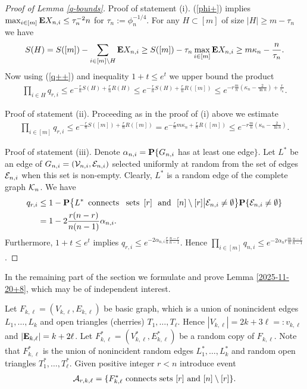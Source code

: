 \documentclass[11pt, a4paper]{article}
\newcommand{\E}{{\bf{E}}}
\newcommand{\PP}{{\bf{P}}}
\begin{document}
\begin{proof}[Proof of Lemma \ref{q-bounds}]
Proof of statement  (i). 
(\ref{phi+}) implies 
$\max_{i\in[m]}\E X_{n,i}\le \tau_n^{-2}n$ for
 $\tau_n:=\phi^{-1/4}_n$. 
For any $H\subset [m]$ of size $|H|\ge m-\tau_n$ we have 
\begin{align*}
S(H)
=
S([m])-\sum_{i\in [m]\setminus H}\E X_{n,i}
\ge 
S([m])-\tau_n \max_{i\in [m]}\E X_{n,i}
\ge 
m\kappa_n-\frac{n}{\tau_n}.
\end{align*}
Now 
using (\ref{q++}) and inequality $1+t\le e^t$ we 
upper bound the product
\begin{align*}
\prod_{i\in H}q_{r,i}
\le e^{-\frac{r}{n}S(H)+\frac{r}{n}R(H)}
\le e^{-\frac{r}{n}S(H)+\frac{r}{n}R([m])}
\le 
e^{-r\frac{m}{n}\left(\kappa_n-\frac{2}{\ln n}\right)+\frac{r}{\tau_n}}.
\end{align*}

Proof of statement (ii). Proceeding as in the proof of (i) above
we estimate
\begin{align*}
\prod_{i\in [m]}
q_{r,i}
\le e^{-\frac{r}{n}S([m])+\frac{r}{n}R([m])}
= e^{-\frac{r}{n}m\kappa_n+\frac{r}{n}R([m])}
\le 
e^{-r\frac{m}{n}\left(\kappa_n-\frac{2}{\ln n}\right)}.
\end{align*}

Proof of statement (iii). Denote 
$\alpha_{n,i}=\PP\{G_{n,i}$ has at least one edge$\}$.  
Let $L^*$ be an edge of 
$G_{n,i}=({\cal V}_{n,i},{\cal E}_{n,i})$ selected uniformly at 
random from the set of edges ${\cal E}_{n,i}$ when this set is non-empty. Clearly, $L^*$ 
is a random edge of the complete graph ${\cal K}_n$. 
We have
\begin{align*}
q_{r,i}
&
\le 
1
-
\PP\bigl\{
L^* {\text{\, connects \, sets\, }} [r] {\text{ \ and \ }} [n]\setminus[r]\bigr|{\cal E}_{n,i}\not=\emptyset
\bigr\}
\PP\{{\cal E}_{n,i}\not=\emptyset\}
\\
&
=
1-2\frac{r(n-r)}{n(n-1)}\alpha_{n,i}.
\end{align*} 
Furthermore, $1+t\le e^t$ implies 
$q_{r,i}
\le 
e^{-2\alpha_{n,i}\frac{r}{n}\frac{n-r}{n-1}}$. 
Hence 
$\prod_{i\in [m]}q_{n,i}\le e^{-2\alpha_n r\frac{m}{n}\frac{n-r}{n-1}}$.
\end{proof}



 
  
  
In the remaining part  of the section we formulate and prove Lemma \ref{2025-11-20+8}, which may be of independent interest.

  
  Let $F_{k,\ell}=(V_{k,\ell}, E_{k,\ell})$ be basic graph, which is a union of nonincident
  edges $L_1,\dots, L_k$ and open triangles (cherries)  $T_1,\dots, T_{\ell}$. Hence 
  $|V_{k,\ell}|=2k+3\ell=:v_{k,\ell}$ and $|\E_{k,\ell}|=k+2\ell$.
  Let $F^*_{k,\ell}=(V_{k,\ell}^*,E_{k,\ell}^*)$ be a random copy of $F_{k,\ell}$. Note that $F^*_{k,\ell}$ is the union of nonincident random edges 
  $L^*_1,\dots, L^*_k$  and random open triangles $T^*_1,\dots, T^*_\ell$.
  Given positive integer $r<n$ introduce event
  \begin{align*}
  {\cal A}_{r,k,\ell}
  =
  \{F^*_{k,\ell} \ {\text{connects sets }} 
  [r]
  \
   {\text{and}}
   \  
   [n]\setminus [r]\}.
  \end{align*}
  
\end{document}
